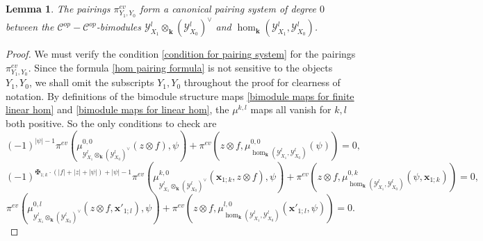 \documentclass[11pt]{amsproc}
\def\K{{\mathbf{k}}}
\def\Y{\mathcal{Y}}
\def\cc{\mathcal{C}}
\newtheorem{lem}{Lemma}[section]
\theoremstyle{remark}
\numberwithin{equation}{section}
\begin{document}
\begin{lem}\label{lem: hom pairing canonical}
The pairings $\pi^{ev}_{Y_{1}, Y_{0}}$ form a canonical pairing system of degree $0$ between the $\cc^{op}-\cc^{op}$-bimodules $\Y^{l}_{X_{1}} \otimes_{\K} (\Y^{l}_{X_{0}})^{\vee}$ and $\hom_{\K}(\Y^{l}_{X_{1}}, \Y^{l}_{X_{0}})$.
\end{lem}
\begin{proof}
We must verify the condition \eqref{condition for pairing system} for the pairings $\pi^{ev}_{Y_{1}, Y_{0}}$.
Since the formula \eqref{hom pairing formula} is not sensitive to the objects $Y_{1}, Y_{0}$,
we shall omit the subscripts $Y_{1}, Y_{0}$ throughout the proof for clearness of notation.
By definitions of the bimodule structure maps \eqref{bimodule maps for finite linear hom} and \eqref{bimodule maps for linear hom},
the $\mu^{k, l}$ maps all vanish for $k, l$ both positive.
So the only conditions to check are
\begin{equation}\label{pairing condition ev 0}
(-1)^{|\psi| - 1} \pi^{ev}( \mu_{\Y^{l}_{X_{1}} \otimes_{\K} (\Y^{l}_{X_{0}})^{\vee}}^{0, 0}(z \otimes f), \psi) 
+ \pi^{ev}(z \otimes f, \mu_{\hom_{\K}(\Y^{l}_{X_{1}}, \Y^{l}_{X_{0}})}^{0, 0}(\psi)) = 0,
\end{equation}
\begin{equation}\label{pairing condition ev 1}
(-1)^{\maltese_{1;k} \cdot (|f|+|z|+|\psi|) + |\psi| - 1} \pi^{ev}(\mu_{\Y^{l}_{X_{1}} \otimes_{\K} (\Y^{l}_{X_{0}})^{\vee}}^{k, 0}(\mathbf{x}_{1;k}, z \otimes f), \psi) 
+ \pi^{ev}(z \otimes f, \mu_{\hom_{\K}(\Y^{l}_{X_{1}}, \Y^{l}_{X_{0}})}^{0, k}(\psi, \mathbf{x}_{1;k})) = 0,
\end{equation}
\begin{equation}\label{pairing condition ev 2}
\pi^{ev}(\mu_{\Y^{l}_{X_{1}} \otimes_{\K} (\Y^{l}_{X_{0}})^{\vee}}^{0, l}(z \otimes f, \mathbf{x}'_{1;l}), \psi) 
+ \pi^{ev}(z \otimes f, \mu_{\hom_{\K}(\Y^{l}_{X_{1}}, \Y^{l}_{X_{0}})}^{l, 0}(\mathbf{x}'_{1;l}, \psi)) = 0.
\end{equation}


\end{proof}
\end{document}
